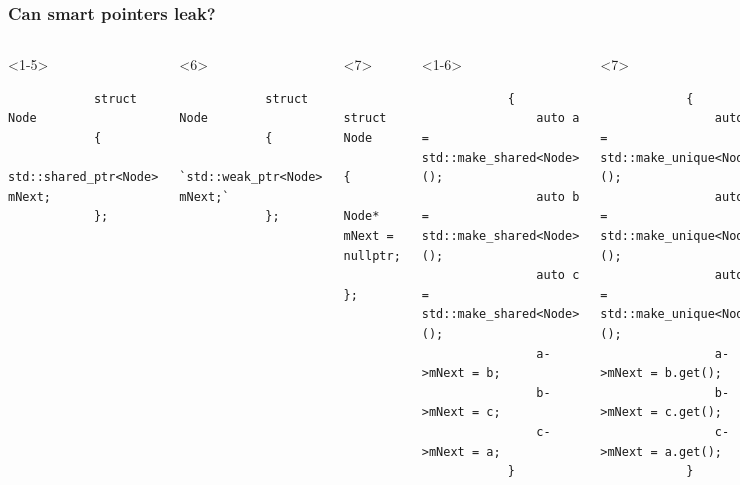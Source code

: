 \documentclass{beamer}
\begin{document}
\begin{frame}[fragile,t]
\frametitle{Can smart pointers leak?}
	\begin{columns}[t]
		\begin{onlyenv}
		\begin{lstlisting}
			struct Node
			{
	    		std::shared_ptr<Node> mNext;
			};
		\end{lstlisting}
		\end{onlyenv}
		\begin{onlyenv}<6>
		\begin{lstlisting}
			struct Node
			{
	    		`std::weak_ptr<Node> mNext;`
			};
		\end{lstlisting}
		\end{onlyenv}
		
		\begin{onlyenv}<7>
		\begin{lstlisting}
			struct Node
			{
	    		Node* mNext = nullptr;
			};
		\end{lstlisting}
		\end{onlyenv}
        \hrulefill
		
		\begin{onlyenv}
		\begin{lstlisting}
            {
			    auto a = std::make_shared<Node>();
			    auto b = std::make_shared<Node>();
			    auto c = std::make_shared<Node>();
			    a->mNext = b;
			    b->mNext = c;
		    	c->mNext = a;
            }
		\end{lstlisting}
		\end{onlyenv}

		\begin{onlyenv}<7>
		\begin{lstlisting}
            {
                auto a = std::make_unique<Node>();
                auto b = std::make_unique<Node>();
                auto c = std::make_unique<Node>();
                a->mNext = b.get();
                b->mNext = c.get();
                c->mNext = a.get();
            }
		\end{lstlisting}
		\end{onlyenv}		
		

\end{columns}
\end{frame}
\end{document}
